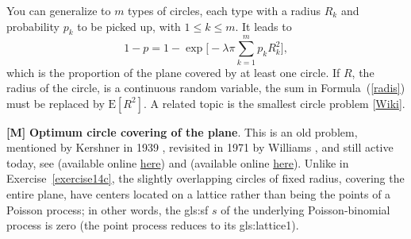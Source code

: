 \documentclass[10pt]{article}
\begin{document}
\begin{Exercise}
You can generalize to $m$ types of circles, each type with a radius $R_k$ and probability $p_k$ to be picked up, with $1\leq k\leq m$. It leads to
\begin{equation}
1-p=1-\exp\Big[-\lambda\pi \sum_{k=1}^m p_kR_k^2\Big], \label{radis}
\end{equation}
which is the proportion of the plane covered by at least one circle. If $R$, the radius of the circle, is a continuous random variable, the sum in Formula~(\ref{radis})
must be replaced by $\mbox{E}[R^2]$. A related topic is the smallest circle problem [\href{https://en.wikipedia.org/wiki/Smallest-circle_problem}{Wiki}].
\end{Exercise}

\begin{Exercise}\label{exercise14d}{\bf [M]}
{\bf Optimum circle covering of the plane}. This is an old problem, mentioned by Kershner in 1939 \cite{circle34}, revisited in 1971 by Williams \cite{m6565}, and still active today, see \cite{coverx} (available online \href{https://theory.stanford.edu/~jvondrak/data/stoch_cover.pdf}{here}) and
\cite{opf} (available online \href{https://arxiv.org/abs/cs/0311013}{here}).
Unlike in Exercise~\ref{exercise14c}, the slightly overlapping circles of fixed radius, covering the entire plane, have centers located on a lattice rather than being the points of a Poisson process; in other words, the \gls{gls:sf} $s$  of the underlying Poisson-binomial process is zero (the point process reduces to its \gls{gls:lattice1}).


\end{Exercise}
\end{document}
